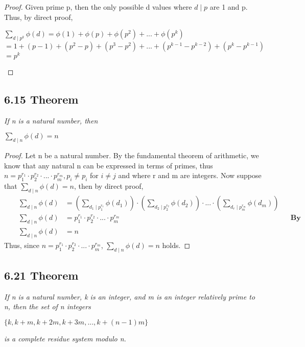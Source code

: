 \documentclass{article}
\begin{document}
\begin{proof}
Given prime p, then the only possible d values where $d \mid p$ are 1 and p. Thus, by direct proof,
\begin{center}
    $\sum_{d \mid p^k} \phi(d) = \phi(1) + \phi(p) + \phi(p^2) + ... + \phi(p^k)$\\
    $= 1 + (p - 1) + (p^2 - p) + (p^3 - p^2) + ... + (p^{k-1} - p^{k-2}) + (p^k - p^{k-1})$\\
    $ = p^k$
\end{center}
\end{proof}

\subsection*{6.15 Theorem} 
\quad \textit{If n is a natural number, then}
\begin{center}
    $\sum_{d \mid n} \phi(d) = n$
\end{center}

\begin{proof}
Let n be a natural number. By the fundamental theorem of arithmetic, we know that any natural n can be expressed in terms of primes, thus $n = p_1^{r_1} \cdot p_2^{r_2} \cdot ... \cdot p_m^{r_m}, p_i \neq p_i$ for $i \neq j$ and where r and m are integers. Now suppose that $\sum_{d \mid n} \phi(d) = n$, then by direct proof,
\begin{align*}
    &&\sum_{d \mid n} \phi(d) &= (\sum_{d_1 \mid p_1^{r_1}} \phi(d_1)) \cdot (\sum_{d_2 \mid p_2^{r_2}} \phi(d_2)) \cdot ... \cdot (\sum_{d_r \mid p_m^{r_m}} \phi(d_m))&&\\
    &&\sum_{d \mid n} \phi(d) &= p_1^{r_1} \cdot p_2^{r_2} \cdot ... \cdot p_m^{r_m}&& \textbf{By Lemma 6.12}\\
    &&\sum_{d \mid n} \phi(d) &= n&&
\end{align*}
Thus, since $n = p_1^{r_1} \cdot p_2^{r_2} \cdot ... \cdot p_m^{r_m}$, $\sum_{d \mid n} \phi(d) = n$ holds.
\end{proof}

\subsection*{6.21 Theorem} 
\quad \textit{If n is a natural number, k is an integer, and m is an integer relatively prime to n, then the set of n integers}
\begin{center}
    $\{k, k+m, k+2m, k+3m,...,k+(n-1)m\}$
\end{center}
\textit{is a complete residue system modulo n.}
\end{document}

